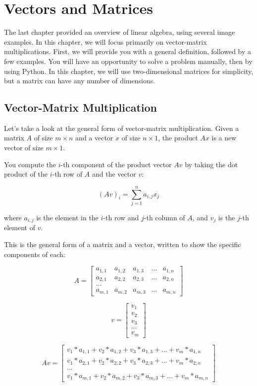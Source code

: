 \chapter{Vectors and Matrices}
  
The last chapter provided an overview of linear algebra, using several image examples. In this chapter, we will focus primarily on vector-matrix multiplications. First, we will provide you with a general definition, followed by a few examples. You will have an opportunity to solve a problem manually, then by using Python. In this chapter, we will use two-dimensional matrices for simplicity, but a matrix can have any number of dimensions.  

\section{Vector-Matrix Multiplication}
Let's take a look at the general form of vector-matrix multiplication. Given a matrix $A$ of size $m \times n$ and a vector $x$ of size $n \times 1$, the product $Ax$ is a new vector of size $m \times 1$. 

You compute the $i$-th component of the product vector $Av$ by taking the dot product of the $i$-th row of $A$ and the vector $v$:

$$(Av)_i = \sum_{j=1}^n a_{i,j}x_j$$

where $a_{i,j}$ is the element in the $i$-th row and $j$-th column of $A$, and $v_j$ is the $j$-th element of $v$.

This is the general form of a matrix and a vector, written to show the specific components of each:

 $$A = \begin{bmatrix}
 a_{1,1} & a_{1,2} & a_{1,3} & ... & a_{1,n}  \\
 a_{2,1} & a_{2,2} & a_{2,3} & ... & a_{2,n}  \\
 ... \\
 a_{m,1} & a_{m,2} & a_{m,3} & ... & a_{m,n}  
\end{bmatrix}$$

$$v = \begin{bmatrix}
 v_{1} \\
 v_{2} \\
 v_{3} \\
 ... \\
 v_{m} 
\end{bmatrix}$$

 $$Av =\begin{bmatrix}
 v_{1}*a_{1,1} +v_{2}*a_{1,2}  +v_{3}*a_{1,3} +... +v_{m}*a_{1,n}  \\
 v_{1}*a_{2,1} +v_{2}*a_{2,2}  +v_{3}*a_{2,3} +... +v_{m}*a_{2,n}  \\
 ... \\
 v_{1}*a_{m,1} +v_{2}*a_{m,2}  +v_{3}*a_{m,3} +... +v_{m}*a_{m,n}  
\end{bmatrix}$$

